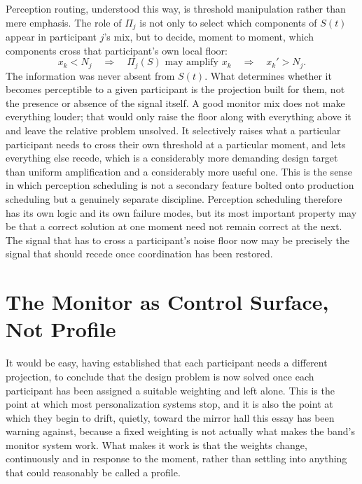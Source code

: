 \documentclass[12pt]{article}
\begin{document}
Perception routing, understood this way, is threshold manipulation rather than mere emphasis. The role of $\Pi_j$ is not only to select which components of $S(t)$ appear in participant $j$'s mix, but to decide, moment to moment, which components cross that participant's own local floor:
\[
x_k < N_j \quad\Longrightarrow\quad \Pi_j(S) \text{ may amplify } x_k \quad\Longrightarrow\quad x_k' > N_j.
\]
The information was never absent from $S(t)$. What determines whether it becomes perceptible to a given participant is the projection built for them, not the presence or absence of the signal itself. A good monitor mix does not make everything louder; that would only raise the floor along with everything above it and leave the relative problem unsolved. It selectively raises what a particular participant needs to cross their own threshold at a particular moment, and lets everything else recede, which is a considerably more demanding design target than uniform amplification and a considerably more useful one. This is the sense in which perception scheduling is not a secondary feature bolted onto production scheduling but a genuinely separate discipline. Perception scheduling therefore has its own logic and its own failure modes, but its most important property may be that a correct solution at one moment need not remain correct at the next. The signal that has to cross a participant's noise floor now may be precisely the signal that should recede once coordination has been restored.

\section{The Monitor as Control Surface, Not Profile}

It would be easy, having established that each participant needs a different projection, to conclude that the design problem is now solved once each participant has been assigned a suitable weighting and left alone. This is the point at which most personalization systems stop, and it is also the point at which they begin to drift, quietly, toward the mirror hall this essay has been warning against, because a fixed weighting is not actually what makes the band's monitor system work. What makes it work is that the weights change, continuously and in response to the moment, rather than settling into anything that could reasonably be called a profile.
\end{document}
